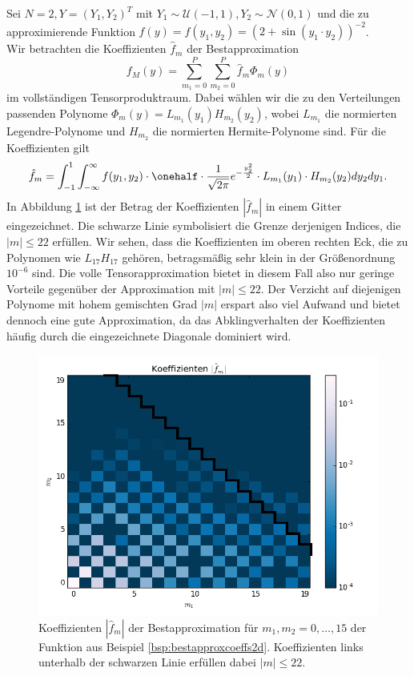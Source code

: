 \begin{mathbsp}
\label{bsp:bestapproxcoeffs2d}
Sei $N=2, Y=(Y_1,Y_2)^T$ mit $Y_1\sim \mathcal{U}(-1,1), Y_2\sim\mathcal{N}(0,1)$ und die zu approximierende Funktion $f(y)=f(y_1,y_2)=(2+\sin(y_1\cdot y_2))^{-2}$.\\
Wir betrachten die Koeffizienten $\hat{f}_m$ der Bestapproximation \[f_M(y)=\sum_{m_1=0}^P\sum_{m_2=0}^P\hat{f}_m\Phi_m(y)\] im vollständigen Tensorproduktraum. Dabei wählen wir die zu den Verteilungen passenden Polynome $\Phi_m(y)=L_{m_1}(y_1)H_{m_2}(y_2)$, wobei $L_{m_1}$ die normierten Legendre-Polynome und $H_{m_2}$ die normierten Hermite-Polynome sind. Für die Koeffizienten gilt
\[\hat{f}_m=\int_{-1}^1\int_{-\infty}^\infty f(y_1,y_2)\cdot \onehalf \cdot \frac{1}{\sqrt{2\pi}}e^{-\frac{y_2^2}{2}}\cdot L_{m_1}(y_1)\cdot H_{m_2}(y_2)dy_2dy_1.\]
In Abbildung \ref{fig:bestapproxcoeffs2d} ist der Betrag der Koeffizienten $|\hat{f}_m|$ in einem Gitter eingezeichnet. Die schwarze Linie symbolisiert die Grenze derjenigen Indices, die $|m|\le 22$ erfüllen. Wir sehen, dass die Koeffizienten im oberen rechten Eck, die zu Polynomen wie $L_{17}H_{17}$ gehören, betragsmäßig sehr klein in der Größenordnung $10^{-6}$ sind. Die volle Tensorapproximation bietet in diesem Fall also nur geringe Vorteile gegenüber der Approximation mit $|m|\le 22$. Der Verzicht auf diejenigen Polynome mit hohem gemischten Grad $|m|$ erspart also viel Aufwand und bietet dennoch eine gute Approximation, da das Abklingverhalten der Koeffizienten häufig durch die eingezeichnete Diagonale dominiert wird.
\begin{figure}[!htb]
\includegraphics[width=\textwidth]{Figures/best_approx_coeffs_2d_example2log.png}
\caption{Koeffizienten $|\hat{f}_m|$ der Bestapproximation für $m_1,m_2=0,\dots,15$ der Funktion aus Beispiel \ref{bsp:bestapproxcoeffs2d}. Koeffizienten links unterhalb der schwarzen Linie erfüllen dabei $|m|\le 22$.}
\label{fig:bestapproxcoeffs2d}
\end{figure}
\end{mathbsp}

